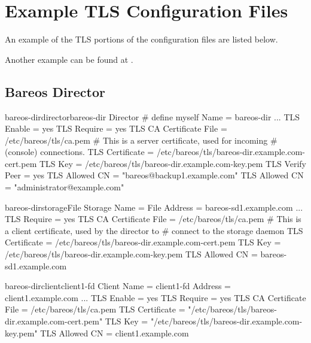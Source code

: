 \section{Example TLS Configuration Files}

An example of the TLS portions of the configuration
files are listed below.

Another example can be found at \bareosTlsConfigurationExample.

\subsection{Bareos Director}

\begin{bareosConfigResource}{bareos-dir}{director}{bareos-dir}
Director {                            # define myself
    Name = bareos-dir
    ...
    TLS Enable = yes
    TLS Require = yes
    TLS CA Certificate File = /etc/bareos/tls/ca.pem
    # This is a server certificate, used for incoming
    # (console) connections.
    TLS Certificate = /etc/bareos/tls/bareos-dir.example.com-cert.pem
    TLS Key = /etc/bareos/tls/bareos-dir.example.com-key.pem
    TLS Verify Peer = yes
    TLS Allowed CN = "bareos@backup1.example.com"
    TLS Allowed CN = "administrator@example.com"
}
\end{bareosConfigResource}

\begin{bareosConfigResource}{bareos-dir}{storage}{File}
Storage {
    Name = File
    Address = bareos-sd1.example.com
    ...
    TLS Require = yes
    TLS CA Certificate File = /etc/bareos/tls/ca.pem
    # This is a client certificate, used by the director to
    # connect to the storage daemon
    TLS Certificate = /etc/bareos/tls/bareos-dir.example.com-cert.pem
    TLS Key = /etc/bareos/tls/bareos-dir.example.com-key.pem
    TLS Allowed CN = bareos-sd1.example.com
}
\end{bareosConfigResource}

\begin{bareosConfigResource}{bareos-dir}{client}{client1-fd}
Client {
    Name = client1-fd
    Address = client1.example.com
    ...
    TLS Enable = yes
    TLS Require = yes
    TLS CA Certificate File = /etc/bareos/tls/ca.pem
    TLS Certificate = "/etc/bareos/tls/bareos-dir.example.com-cert.pem"
    TLS Key = "/etc/bareos/tls/bareos-dir.example.com-key.pem"
    TLS Allowed CN = client1.example.com
}
\end{bareosConfigResource}



